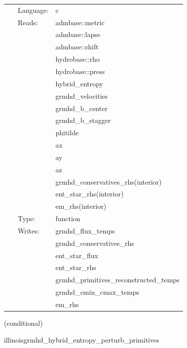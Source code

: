 \documentclass{article}
\begin{document}
 \begin{tabular*}{160mm}{cll} 
~ & Language:  & c \\ 
~ & Reads:  & admbase::metric \\ 
~& ~ &admbase::lapse\\ 
~& ~ &admbase::shift\\ 
~& ~ &hydrobase::rho\\ 
~& ~ &hydrobase::press\\ 
~& ~ &hybrid\_entropy\\ 
~& ~ &grmhd\_velocities\\ 
~& ~ &grmhd\_b\_center\\ 
~& ~ &grmhd\_b\_stagger\\ 
~& ~ &phitilde\\ 
~& ~ &ax\\ 
~& ~ &ay\\ 
~& ~ &az\\ 
~& ~ &grmhd\_conservatives\_rhs(interior)\\ 
~& ~ &ent\_star\_rhs(interior)\\ 
~& ~ &em\_rhs(interior)\\ 
~ & Type:  & function \\ 
~ & Writes:  & grmhd\_flux\_temps \\ 
~& ~ &grmhd\_conservatives\_rhs\\ 
~& ~ &ent\_star\_flux\\ 
~& ~ &ent\_star\_rhs\\ 
~& ~ &grmhd\_primitives\_reconstructed\_temps\\ 
~& ~ &grmhd\_cmin\_cmax\_temps\\ 
~& ~ &em\_rhs\\ 
\end{tabular*} 


\vspace{5mm}

   (conditional) 

\hspace{5mm} illinoisgrmhd\_hybrid\_entropy\_perturb\_primitives 

\hspace{5mm}{\it entropy+hybrid version of illinoisgrmhd\_perturb\_primitives } 


\hspace{5mm}
\end{document}
